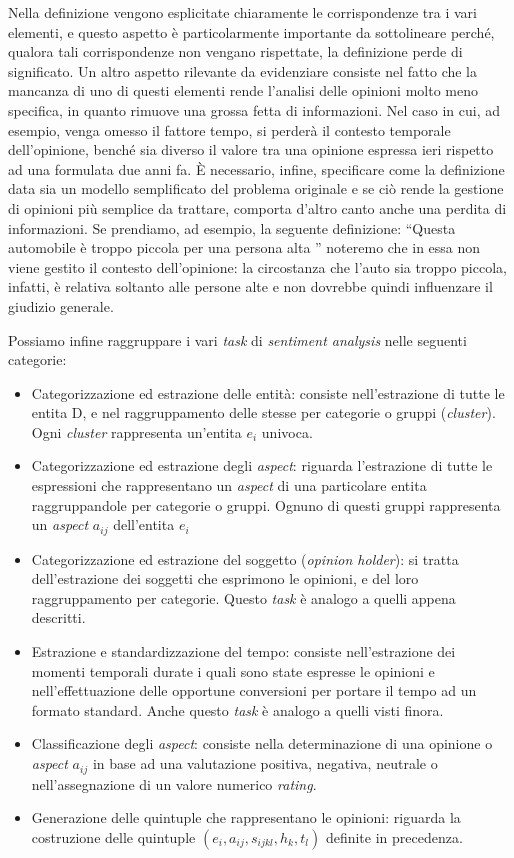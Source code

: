 \documentclass[a4paper,12pt,openright,twoside]{report}
\theoremstyle{definition}
\begin{document}
Nella definizione vengono esplicitate chiaramente le corrispondenze tra i vari elementi,
e questo aspetto è particolarmente importante da sottolineare perché, 
qualora tali corrispondenze non vengano rispettate,
la definizione perde di significato.
Un altro aspetto rilevante da evidenziare consiste nel fatto che la mancanza di uno di questi elementi rende 
l'analisi delle opinioni molto meno specifica, in quanto rimuove una grossa fetta di
informazioni. Nel caso in cui, ad esempio, venga omesso il fattore tempo, si perderà il contesto
temporale dell'opinione, bench\'e sia diverso il valore tra una opinione espressa ieri rispetto ad una
formulata due anni fa.
\`E necessario, infine, specificare come la definizione data sia un modello semplificato del problema
originale e se ciò rende la gestione di opinioni più semplice da trattare,
comporta d'altro canto anche una perdita di informazioni. Se prendiamo, ad esempio, la seguente definizione:
``Questa automobile è troppo piccola per una persona alta ''
noteremo che in essa non viene gestito il contesto dell’opinione: la circostanza che l’auto sia troppo piccola, 
infatti, è relativa soltanto alle persone alte e non dovrebbe quindi influenzare il giudizio generale.

Possiamo infine raggruppare i vari \emph{task} di \emph{sentiment analysis} nelle seguenti categorie:
\begin{itemize}
	\item Categorizzazione ed estrazione delle entità: consiste nell'estrazione di tutte le entita D,
		e nel raggruppamento delle stesse per categorie o gruppi (\emph{cluster}). Ogni \emph{cluster}
		rappresenta un'entita $e_i$ univoca.
	\item Categorizzazione ed estrazione degli \emph{aspect}: riguarda l'estrazione di tutte le espressioni
		che rappresentano un \emph{aspect} di una particolare entita raggruppandole
		per categorie o gruppi. Ognuno di questi gruppi rappresenta un \emph{aspect} $a_{ij}$
		dell'entita $e_i$
	\item Categorizzazione ed estrazione del soggetto (\emph{opinion holder}): si tratta dell'estrazione
		dei soggetti che esprimono le opinioni, e del loro raggruppamento per categorie. Questo \emph{task}
		è analogo a quelli appena descritti.
	\item Estrazione e standardizzazione del tempo: consiste nell'estrazione dei momenti temporali 
		durate i quali 
		sono state espresse le opinioni e nell'effettuazione delle opportune conversioni per portare
		il tempo ad un formato standard. Anche questo \emph{task} è analogo a quelli visti finora.
	\item Classificazione degli \emph{aspect}: consiste nella determinazione di una opinione o \emph{aspect} $a_{ij}$
		in base ad una valutazione positiva, negativa, neutrale o nell'assegnazione di un valore numerico \emph{rating}.
	\item Generazione delle quintuple che rappresentano le opinioni: riguarda la costruzione delle quintuple 
		$(e_i, a_{ij}, s_{ijkl}, h_k, t_l)$ definite in precedenza.
\end{itemize}
\end{document}
